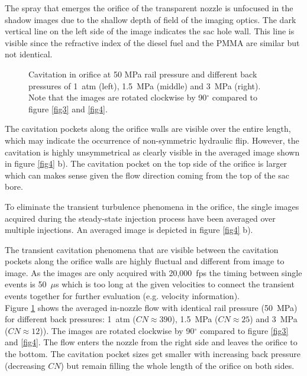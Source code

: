 \documentclass[letterpaper,twocolumn,10pt]{ilass}
\begin{document}
The spray that emerges the orifice of the transparent nozzle is unfocused in the shadow images
due to the shallow depth of field of the imaging optics. The dark vertical line on the left side of the image indicates the sac hole wall.
This line is visible since the refractive index of the diesel fuel and the PMMA are
similar but not identical.


\begin{figure}[h]
\begin{center}
\end{center}
\vspace*{-2mm}
\caption{Cavitation in orifice at 50 MPa rail pressure and different back pressures of
         1~atm (left), 1.5~MPa (middle) and 3~MPa (right). Note that the images are
				 rotated clockwise by 90$^{\circ}$ compared to figure \ref{fig3} and \ref{fig4}.}
\label{fig5} 
\end{figure}


The cavitation pockets along the orifice walls are visible over the entire length,
which may indicate the occurrence of non-symmetric hydraulic flip.
However, the cavitation is highly unsymmetrical as clearly visible in the averaged image shown
in figure \ref{fig4} b). The cavitation pocket on the top side of the orifice is larger which
can makes sense given the flow direction coming from the top of the sac bore.
%

To eliminate the transient turbulence phenomena in the orifice, the single images
acquired during the steady-state injection process have been averaged over multiple injections. An averaged image is depicted in figure \ref{fig4} b).
%

The transient cavitation phenomena that are visible between the cavitation pockets along the
orifice walls are highly fluctual and different from image to image.  As the images are only
acquired with 20,000~fps the timing between single events is 50~$\mu$s which is too long at
the given velocities to connect the transient events together for further evaluation
(e.g. velocity information).\\
%
Figure \ref{fig5} shows the averaged in-nozzle flow with identical rail pressure (50~MPa)
for different back pressures: 1~atm ($CN \approx 390$), 1.5~MPa ($CN \approx 25$) and 3~MPa
($CN \approx 12$)). The images are rotated clockwise by 90$^{\circ}$ compared to figure
\ref{fig3} and \ref{fig4}. The flow enters the nozzle from the right side and leaves the
orifice to the bottom. The cavitation pocket sizes get smaller with increasing back pressure
(decreasing $CN$) but remain filling the whole length of the orifice on both sides.
%
\end{document}
